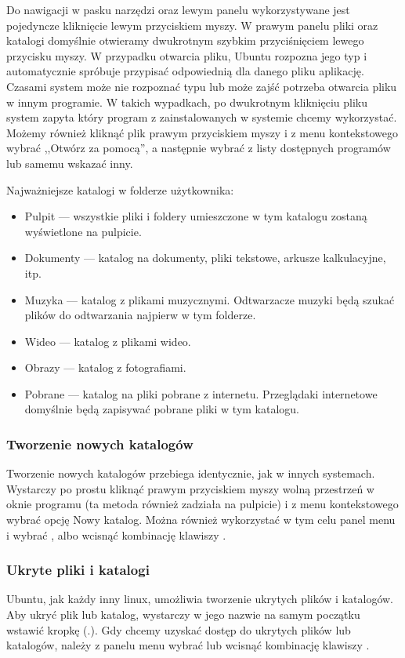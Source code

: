 Do nawigacji w pasku narzędzi oraz lewym panelu wykorzystywane jest pojedyncze kliknięcie lewym przyciskiem myszy. W prawym panelu pliki oraz katalogi domyślnie otwieramy dwukrotnym szybkim przyciśnięciem lewego przycisku myszy. W przypadku otwarcia pliku, Ubuntu rozpozna jego typ i automatycznie spróbuje przypisać odpowiednią dla danego pliku aplikację. Czasami system może nie rozpoznać typu lub może zajść potrzeba otwarcia pliku w innym programie. W takich wypadkach, po dwukrotnym kliknięciu pliku system zapyta który program z zainstalowanych w systemie chcemy wykorzystać. Możemy również kliknąć plik prawym przyciskiem myszy i z menu kontekstowego wybrać ,,Otwórz za pomocą'', a następnie wybrać z listy dostępnych programów lub samemu wskazać inny.

Najważniejsze katalogi w folderze użytkownika:
\begin{itemize}
\item \textcolor{ubuntu_orange}{Pulpit} --- wszystkie pliki i foldery umieszczone w tym katalogu zostaną wyświetlone na pulpicie.
\item \textcolor{ubuntu_orange}{Dokumenty} --- katalog na dokumenty, pliki tekstowe, arkusze kalkulacyjne, itp.
\item \textcolor{ubuntu_orange}{Muzyka} --- katalog z plikami muzycznymi. Odtwarzacze muzyki będą szukać plików do odtwarzania najpierw w tym folderze.
\item \textcolor{ubuntu_orange}{Wideo} --- katalog z plikami wideo.
\item \textcolor{ubuntu_orange}{Obrazy} --- katalog z fotografiami.
\item \textcolor{ubuntu_orange}{Pobrane} --- katalog na pliki pobrane z internetu. Przeglądaki internetowe domyślnie będą zapisywać pobrane pliki w tym katalogu.
\end{itemize}

\subsubsection{Tworzenie nowych katalogów}
Tworzenie nowych katalogów przebiega identycznie, jak w innych systemach. Wystarczy po prostu kliknąć prawym przyciskiem myszy wolną przestrzeń w oknie programu (ta metoda również zadziała na pulpicie) i z menu kontekstowego wybrać opcję \textcolor{ubuntu_orange}{Nowy katalog}. Można również wykorzystać w tym celu panel menu i wybrać , albo wcisnąć kombinację klawiszy .

\subsubsection{Ukryte pliki i katalogi}
Ubuntu, jak każdy inny linux, umożliwia tworzenie ukrytych plików i katalogów. Aby ukryć plik lub katalog, wystarczy w jego nazwie na samym początku wstawić kropkę (.). Gdy chcemy uzyskać dostęp do ukrytych plików lub katalogów, należy z panelu menu wybrać  lub wcisnąć kombinację klawiszy .

